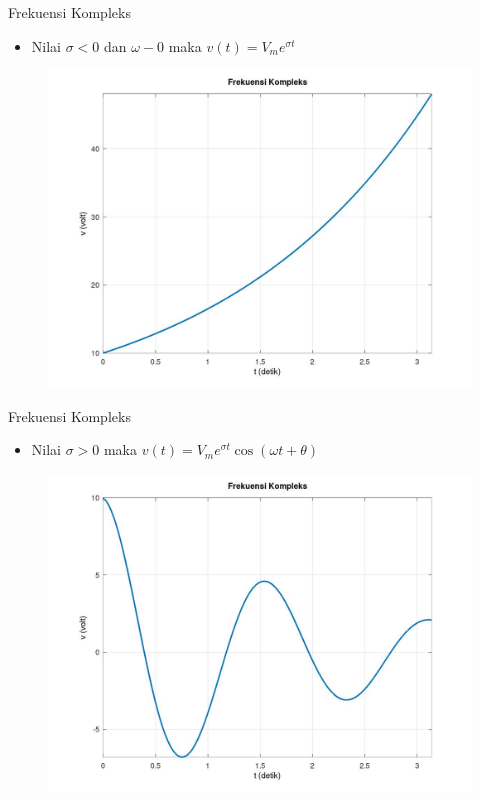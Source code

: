 \documentclass[10pt]{beamer}
\begin{document}
\begin{frame}{Frekuensi Kompleks}
    \begin{itemize}
        \item Nilai $\sigma < 0$ dan $\omega - 0$ maka $v(t) = V_m e^{\sigma t}$
    \end{itemize}
    \begin{figure}
        \includegraphics[width=0.8\linewidth]{gambar4.jpg}
    \end{figure}
\end{frame}

\begin{frame}{Frekuensi Kompleks}
    \begin{itemize}
        \item Nilai $\sigma > 0$ maka $v(t) = V_m e^{\sigma t} \cos(\omega t + \theta) $
    \end{itemize}
    \begin{figure}
        \includegraphics[width=0.8\linewidth]{gambar5.jpg}
    \end{figure}
\end{frame}
\end{document}

